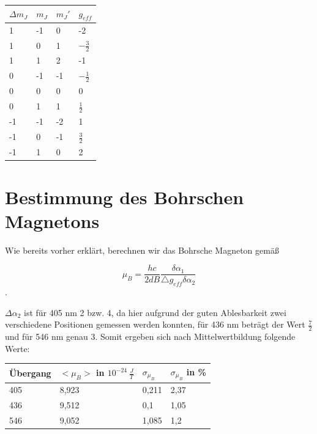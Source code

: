 \documentclass[bigchapter,colorback,accentcolor=tud4b,linedtoc,11pt]{tudreport}
\begin{document}
\begin{center}
  \begin{tabular}{|p{2cm}|p{2cm}|p{2cm}|p{2cm}|}
    \hline
    $\Delta m_J$ & $m_J$ & $m_J'$ & $g_{eff}$ \\ \hline
    1               & -1               & 0 & -2 \\ \hline
    1               & 0                & 1 & $-\frac{3}{2}$ \\ \hline
    1               & 1                & 2 & -1 \\ \hline
    0               & -1               & -1 & $-\frac{1}{2}$ \\ \hline
    0               & 0                & 0 & 0 \\ \hline
    0               & 1                & 1 & $\frac{1}{2}$ \\ \hline
    -1              & -1               & -2 & 1 \\ \hline
    -1              & 0                & -1 & $\frac{3}{2}$ \\ \hline
    -1              & 1                & 0 & 2 \\ \hline
    \end{tabular}
\end{center}

\section{Bestimmung des Bohrschen Magnetons}

Wie bereits vorher erklärt, berechnen wir das Bohrsche Magneton gemäß

$$\mu_{B}=\frac{hc}{2dB}\frac{\delta\alpha_{1}}{\triangle g_{eff}\delta\alpha_{2}}$$.

$\Delta \alpha_2$ ist für 405 nm 2 bzw. 4, da hier aufgrund der guten Ablesbarkeit zwei verschiedene Positionen gemessen werden konnten, für 436 nm beträgt der Wert $\frac{7}{2}$ und für 546 nm genau 3. Somit ergeben sich nach Mittelwertbildung folgende Werte:

\begin{center}
  \begin{tabular}{|p{2cm}|p{4cm}|p{2cm}|p{2cm}|}
    \hline
    Übergang & $< \mu_B >$ in $10^{-24}~ \frac{J}{T}$ & $\sigma_{\mu_B}$ & $\sigma_{\mu_B}$ in \% \\ \hline
    405               & 8,923 & 0,211 & 2,37  \\ \hline
    436               & 9,512 & 0,1 & 1,05  \\ \hline
    546               & 9,052 & 1,085 & 1,2  \\ \hline
    \end{tabular}
\end{center}
\end{document}
